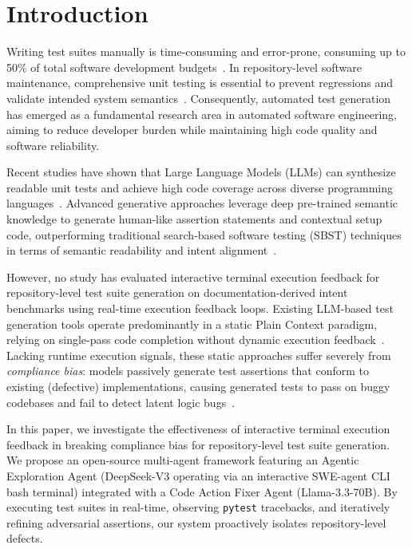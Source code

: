 \section{Introduction}
\label{sec:intro}

Writing test suites manually is time-consuming and error-prone, consuming up to 50\% of total software development budgets~\cite{myers2011art, evosuite, randoop, swebench}. In repository-level software maintenance, comprehensive unit testing is essential to prevent regressions and validate intended system semantics~\cite{docprompting, repobench, cse}. Consequently, automated test generation has emerged as a fundamental research area in automated software engineering, aiming to reduce developer burden while maintaining high code quality and software reliability.

Recent studies have shown that Large Language Models (LLMs) can synthesize readable unit tests and achieve high code coverage across diverse programming languages~\cite{bareiss2022code, lemieux2023codamosa, xie2023chatunitest}. Advanced generative approaches leverage deep pre-trained semantic knowledge to generate human-like assertion statements and contextual setup code, outperforming traditional search-based software testing (SBST) techniques in terms of semantic readability and intent alignment~\cite{siddiq2023exploratory, schafer2023empirical}.

However, no study has evaluated interactive terminal execution feedback for repository-level test suite generation on documentation-derived intent benchmarks using real-time execution feedback loops. Existing LLM-based test generation tools operate predominantly in a static Plain Context paradigm, relying on single-pass code completion without dynamic execution feedback~\cite{testexplora}. Lacking runtime execution signals, these static approaches suffer severely from \textit{compliance bias}: models passively generate test assertions that conform to existing (defective) implementations, causing generated tests to pass on buggy codebases and fail to detect latent logic bugs~\cite{testexplora, sweagent}.

In this paper, we investigate the effectiveness of interactive terminal execution feedback in breaking compliance bias for repository-level test suite generation. We propose an open-source multi-agent framework featuring an Agentic Exploration Agent (DeepSeek-V3 operating via an interactive SWE-agent CLI bash terminal) integrated with a Code Action Fixer Agent (Llama-3.3-70B). By executing test suites in real-time, observing \texttt{pytest} tracebacks, and iteratively refining adversarial assertions, our system proactively isolates repository-level defects.

